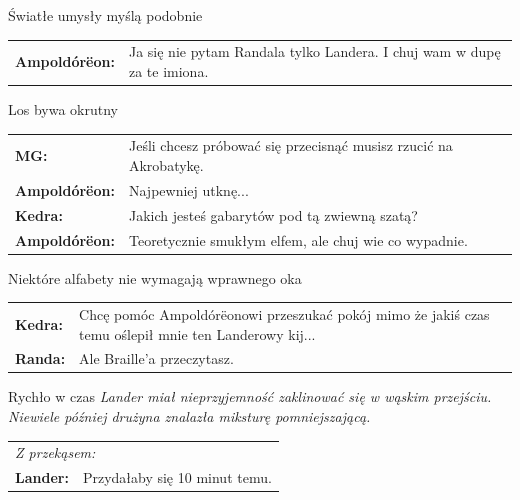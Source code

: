 \documentclass[10pt,twoside,twocolumn]{book}
\begin{document}
\begin{rpg-quotebox}{Światłe umysły myślą podobnie}
   \begin{tabularx}{\columnwidth}{lX}
\textbf{Ampoldórëon:} & Ja się nie pytam Randala tylko Landera. I chuj wam w dupę za te imiona.\\
   \end{tabularx}
\end{rpg-quotebox}


\begin{rpg-quotebox}{Los bywa okrutny}
   \begin{tabularx}{\columnwidth}{lX}
      \textbf{MG:} & Jeśli chcesz próbować się przecisnąć musisz rzucić na Akrobatykę.\\
      \textbf{Ampoldórëon:} & Najpewniej utknę...\\
      \textbf{Kedra:} & Jakich jesteś gabarytów pod tą zwiewną szatą?\\
      \textbf{Ampoldórëon:} & Teoretycznie smukłym elfem, ale chuj wie co wypadnie.\\
   \end{tabularx}
\end{rpg-quotebox}


\begin{rpg-quotebox}{Niektóre alfabety nie wymagają wprawnego oka}
   \begin{tabularx}{\columnwidth}{lX}
      \textbf{Kedra:} & Chcę pomóc Ampoldórëonowi przeszukać pokój mimo że jakiś czas temu oślepił mnie ten Landerowy kij...\\
      \textbf{Randa:} & Ale Braille'a przeczytasz.\\
   \end{tabularx}
\end{rpg-quotebox}


\begin{rpg-quotebox}{Rychło w czas}
   \textit{Lander miał nieprzyjemność zaklinować się w wąskim przejściu. Niewiele później drużyna znalazła miksturę pomniejszającą.}\\

   \begin{tabularx}{\columnwidth}{lX}
      \multicolumn{2}{l}{\textit{Z przekąsem:}}\\
      \textbf{Lander:} & Przydałaby się 10 minut temu.\\
   \end{tabularx}
\end{rpg-quotebox}
\end{document}
